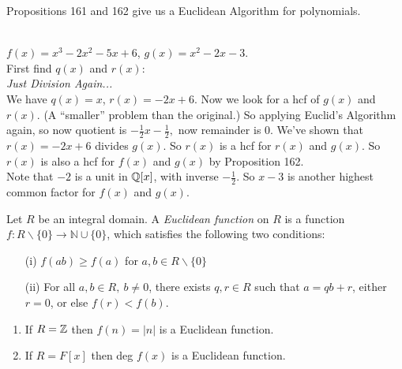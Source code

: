 \noindent Propositions 161 and 162 give us a Euclidean Algorithm for polynomials. \\

\begin{example} \\$f(x) = x^3 - 2x^2 -5x + 6$, $g(x) = x^2 - 2x -3$.\\
First find $q(x)$ and $r(x)$:\\
\textit{ Just Division Again...}\\

\noindent We have $q(x) = x$, $r(x) = -2x + 6$. Now we look for a hcf of $g(x)$ and $r(x).$ (A ``smaller'' problem than the original.) So applying Euclid's Algorithm again, so now quotient is $-\frac{1}{2}x - \frac{1}{2} ,$ now remainder is $0$. We've shown that $r(x) = -2x + 6$ divides $g(x)$. So $r(x)$ is a hcf for $r(x)$ and $g(x)$. So $r(x)$ is also a hcf for $f(x)$ and $g(x)$ by Proposition 162.\\

Note that $-2$ is a unit in $\mathbb{Q}[x]$, with inverse $-\frac{1}{2}$. So $x-3$ is another highest common factor for $f(x)$ and $g(x)$.
\end{example}



\begin{definition} Let  
 $R$ be an integral domain. A \emph{Euclidean function} on $R$ is a function $f: R\backslash\{0\} \to \mathbb{N} \cup \{0\}$, which satisfies the following two conditions: \begin{enumerate}
 \item[(i)] $f(ab) \geq f(a)$ for $a,b \in R\backslash\{0\}$
 \item[(ii)] For all $a,b \in R,~b \neq 0$, there exists $q,r \in R$ such that $a = qb + r$, either $r = 0$, or else $f(r) < f(b)$.	
 \end{enumerate}\end{definition}

\begin{examples} \begin{enumerate}
 \item If $R = \mathbb{Z}$ then $f(n) = |n|$ is a Euclidean function. 
 \item If $R = F[x]$ then deg $f(x)$ is a Euclidean function.	
 \end{enumerate}\end{examples}
 \vspace*{5pt}

